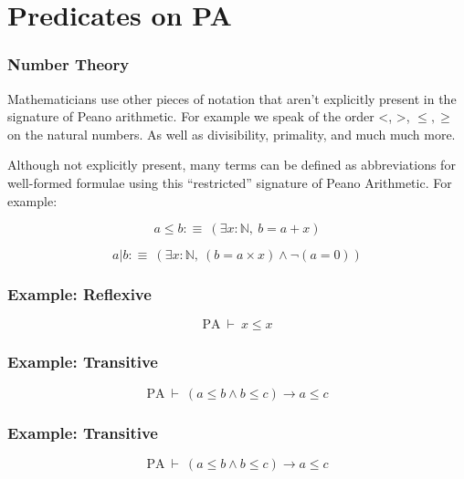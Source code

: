 \documentclass{beamer}
\theoremstyle{indentDefn} \newtheorem{defn}[]{Definition}
\begin{document}
\section{Predicates on PA}

\begin{frame}
	\frametitle{Number Theory}

	Mathematicians use other pieces of notation that aren't explicitly present in the signature of Peano arithmetic. For example we speak of the order <, >, $\leq, \geq$ on the natural numbers. As well as divisibility, primality, and much much more. 

	Although not explicitly present, many terms can be defined as abbreviations for well-formed formulae using this ``restricted'' signature of Peano Arithmetic. For example: 

	$$ a \leq b :\equiv \ (\exists x : \mathbb{N}, \ b = a + x)$$

	$$ a | b :\equiv \ (\exists x : \mathbb{N}, \ (b = a \times x) \land \lnot(a = 0))$$
\end{frame}

\begin{frame}
	\frametitle{Example: Reflexive}

	$$\text{PA} \ \vdash \ x \leq x$$

	\vspace{6cm}

\end{frame}

\begin{frame}
	\frametitle{Example: Transitive}

	$$\text{PA} \ \vdash \ (a \leq b \land b \leq c) \to a \leq c$$

	\vspace{6cm}

\end{frame}

\begin{frame}
	\frametitle{Example: Transitive}

	$$\text{PA} \ \vdash \ (a \leq b \land b \leq c) \to a \leq c$$

	\vspace{6cm}

\end{frame}
\end{document}
